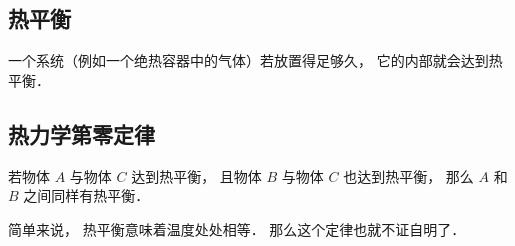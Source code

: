 
\subsection{热平衡}
一个系统（例如一个绝热容器中的气体）若放置得足够久， 它的内部就会达到热平衡．

\subsection{热力学第零定律}
若物体 $A$ 与物体 $C$ 达到热平衡， 且物体 $B$ 与物体 $C$ 也达到热平衡， 那么 $A$ 和 $B$ 之间同样有热平衡．

简单来说， 热平衡意味着温度处处相等． 那么这个定律也就不证自明了．
